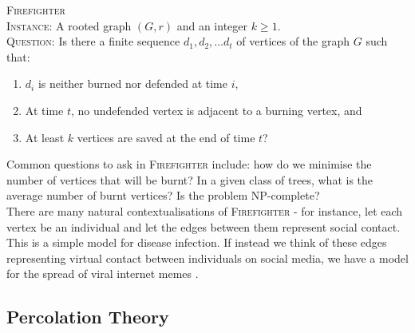 \documentclass[11pt]{amsart}
\begin{document}
{\scshape Firefighter}\\ \indent
{\scshape Instance:} A rooted graph $(G,r)$ and an integer $k\geq 1$.\\ \indent
{\scshape Question:} Is there a finite sequence $d_1, d_2,\dots d_t$ of vertices of the graph $G$ such that:
	\begin{enumerate}[label=\roman*]
		\item $d_i$ {is neither burned nor defended at time} $i$,
		\item {At time} $t$, no undefended vertex is adjacent to a burning vertex, and
		\item {At least} $k$ {vertices are saved at the end of time} $t$?
	\end{enumerate}

Common questions to ask in {\scshape Firefighter} include: how do we minimise the number of vertices that will be burnt? In a given class of trees, what is the average number of burnt vertices? Is the problem NP-complete?\\

There are many natural contextualisations of {\scshape Firefighter} - for instance, let each vertex be an individual and let the edges between them represent social contact. This is a simple model for disease infection. If instead we think of these edges representing virtual contact between individuals on social media, we have a model for the spread of viral internet memes \cite{obrien19}.


\subsection{Percolation Theory}
\label{sec:perc}
\end{document}
